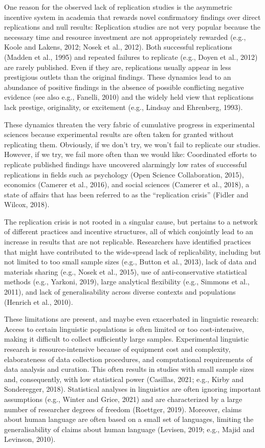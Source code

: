 \documentclass[]{elsarticle} %
\begin{document}
One reason for the observed lack of replication studies is the asymmetric incentive system in academia that rewards novel confirmatory findings over direct replications and null results: Replication studies are not very popular because the necessary time and resource investment are not appropriately rewarded (e.g., Koole and Lakens, 2012; Nosek et al., 2012). Both successful replications (Madden et al., 1995) and repeated failures to replicate (e.g., Doyen et al., 2012) are rarely published. Even if they are, replications usually appear in less prestigious outlets than the original findings. These dynamics lead to an abundance of positive findings in the absence of possible conflicting negative evidence (see also e.g., Fanelli, 2010) and the widely held view that replications lack prestige, originality, or excitement (e.g., Lindsay and Ehrenberg, 1993).

These dynamics threaten the very fabric of cumulative progress in experimental sciences because experimental results are often taken for granted without replicating them. Obviously, if we don't try, we won't fail to replicate our studies. However, if we try, we fail more often than we would like: Coordinated efforts to replicate published findings have uncovered alarmingly low rates of successful replications in fields such as psychology (Open Science Collaboration, 2015), economics (Camerer et al., 2016), and social sciences (Camerer et al., 2018), a state of affairs that has been referred to as the ``replication crisis'' (Fidler and Wilcox, 2018).

The replication crisis is not rooted in a singular cause, but pertains to a network of different practices and incentive structures, all of which conjointly lead to an increase in results that are not replicable. Researchers have identified practices that might have contributed to the wide-spread lack of replicability, including but not limited to too small sample sizes (e.g., Button et al., 2013), lack of data and materials sharing (e.g., Nosek et al., 2015), use of anti-conservative statistical methods (e.g., Yarkoni, 2019), large analytical flexibility (e.g., Simmons et al., 2011), and lack of generalisability across diverse contexts and populations (Henrich et al., 2010).

These limitations are present, and maybe even exacerbated in linguistic research: Access to certain linguistic populations is often limited or too cost-intensive, making it difficult to collect sufficiently large samples. Experimental linguistic research is resource-intensive because of equipment cost and complexity, elaborateness of data collection procedures, and computational requirements of data analysis and curation. This often results in studies with small sample sizes and, consequently, with low statistical power (Casillas, 2021; e.g., Kirby and Sonderegger, 2018). Statistical analyses in linguistics are often ignoring important assumptions (e.g., Winter and Grice, 2021) and are characterized by a large number of researcher degrees of freedom (Roettger, 2019). Moreover, claims about human language are often based on a small set of languages, limiting the generalisability of claims about human language (Levisen, 2019; e.g., Majid and Levinson, 2010).
\end{document}
